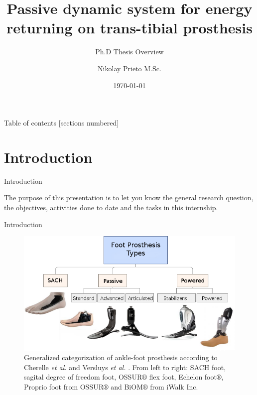 \documentclass[10pt]{beamer}
\title{Passive dynamic system for energy returning on trans-tibial prosthesis}
\subtitle{Ph.D Thesis Overview}
\date{\today}
\date{}
\author{Nikolay Prieto M.Sc.}
\institute{Dr.Ing. Carlos Julio Cort\'es, Andr\'es Tovar Ph.D. }
\begin{document}
\maketitle

\begin{frame}{Table of contents}
  [sections numbered]
  \tableofcontents[hideallsubsections]
\end{frame}

\section{Introduction}

\begin{frame}[fragile]{Introduction}

The purpose of this presentation is to let you know the general research question, the objectives, activities done to date and the tasks in this internship.

\end{frame}

\begin{frame}[fragile]{Introduction}

\begin{figure}[H]
\begin{centering}
\includegraphics[scale=0.4]{GeneracionesprotesisEng}
\par\end{centering}

\caption{\label{fig:Categorizaci=0000F3n-seg=0000FAn-Cherelle} Generalized categorization of ankle-foot prosthesis according to Cherelle \emph{et al.}\cite{Cherelle2014a} and Versluys \emph{et al.} \cite{Versluys2009}. From left to right: SACH foot, sagital degree of freedom foot, OSSUR$\circledR$ flex foot, Echelon foot$\circledR$, Proprio foot from OSSUR$\circledR$ and BiOM$\circledR$ from iWalk Inc.}
\end{figure}
\end{frame}
\end{document}
